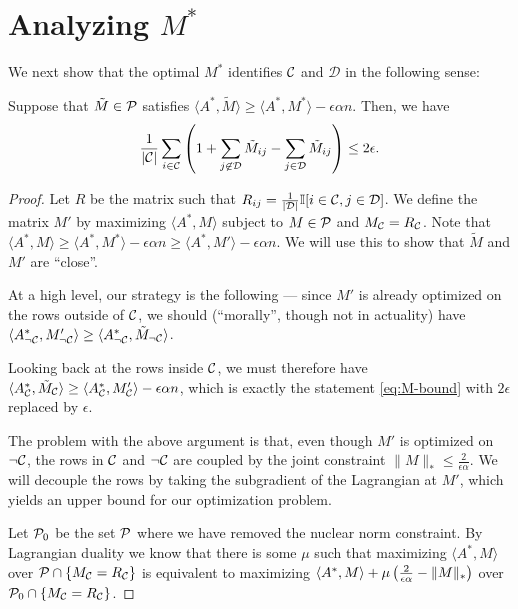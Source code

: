 \documentclass[11pt]{article}
\newcommand{\M}{\tilde{M}}
\newcommand{\Aa}{A^*}
\newcommand{\sD}{\mathcal{D}}
\begin{document}
\section{Analyzing $M^*$}
We next show that the optimal $M^*$ identifies $\mathcal{C}$ and $\sD$ in the following sense:
\begin{proposition}
Suppose that $\M \in \sP$ satisfies $\langle \Aa, \M \rangle \geq \langle \Aa, M^* \rangle - \epsilon \alpha n$. 
Then, we have 
\begin{equation}
\label{eq:M-bound}
\frac{1}{|\sC|} \sum_{i \in \sC} \p{1 + \sum_{j \not\in \sD} \M_{ij} - \sum_{j \in \sD} \M_{ij}} \leq 2\epsilon.
\end{equation}
\end{proposition}
\begin{proof}
Let $R$ be the matrix such that $R_{ij} = \frac{1}{|\sD|}\bI[i \in \sC, j \in \sD]$. 
We define the matrix $M'$ by maximizing $\langle \Aa, M \rangle$ subject to $M \in \mathcal{P}$ and 
$M_{\mathcal{C}} = R_{\mathcal{C}}$. Note that 
$\langle \Aa, M \rangle \geq \langle \Aa, M^* \rangle - \epsilon \alpha n \geq \langle \Aa, M' \rangle - \epsilon \alpha n$. 
We will use this to show that $\M$ and $M'$ are ``close''.

At a high level, our strategy is the following --- since $M'$ is already optimized 
on the rows outside of $\mathcal{C}$, we should (``morally'', though not in actuality) have 
$\langle \Aa_{\neg \sC}, M'_{\neg \sC} \rangle \geq \langle \Aa_{\neg \sC}, \M_{\neg \sC} \rangle$. 

Looking back at the rows inside $\mathcal{C}$, we must therefore have 
$\langle \Aa_{\sC}, \M_{\sC} \rangle \geq \langle \Aa_{\sC}, M'_{\sC} \rangle - \epsilon \alpha n$, 
which is exactly the statement \eqref{eq:M-bound} with $2\epsilon$ replaced by $\epsilon$.

The problem with the above argument is that, even though $M'$ is optimized on $\neg \mathcal{C}$, the rows in 
$\mathcal{C}$ and $\neg \mathcal{C}$ are coupled by the joint constraint $\|M\|_* \leq \frac{2}{\epsilon\alpha}$. We 
will decouple the rows by taking the subgradient of the Lagrangian at $M'$, which yields an upper bound 
for our optimization problem.

Let $\mathcal{P}_0$ be the set $\mathcal{P}$ where we have removed the nuclear norm constraint. By Lagrangian duality we 
know that there is some $\mu$ such that maximizing $\langle \Aa, M \rangle$ over $\mathcal{P} \cap \{M_{\mathcal{C}} = R_{\mathcal{C}}\}$ 
is equivalent to maximizing $\langle \Aa, M \rangle + \mu\p{\frac{2}{\epsilon\alpha} - \|M\|_*}$ over 
$\mathcal{P}_0 \cap \{M_{\mathcal{C}} = R_{\mathcal{C}}\}$. 


\end{proof}
\end{document}
